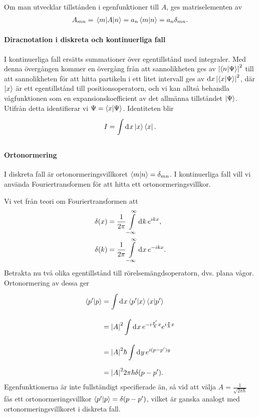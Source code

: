 Om man utvecklar tillstånden i egenfunktioner till $A$, ges matriselementen av
\begin{align*}
	A_{mn} = \mel{m}{A}{n} = a_{n}\braket{m}{n} = a_{n}\delta_{mn}.
\end{align*}

\paragraph{Diracnotation i diskreta och kontinuerliga fall}
I kontinuerliga fall ersätts summationer över egentillstånd med integraler. Med denna övergången kommer en övergång från att sannolikheten ges av $\abs{\braket{n}{\Psi}}^{2}$ till att sannolikheten för att hitta partikeln i ett litet intervall ges av $\dd{x}\abs{\braket{x}{\Psi}}^{2}$, där $\ket{x}$ är ett egentillstånd till positionsoperatorn, och vi kan alltså behandla vågfunktionen som en expansionskoefficient av det allmänna tillståndet $\ket{\Psi}$. Utifrån detta identifierar vi $\Psi = \braket{x}{\Psi}$. Identiteten blir
\begin{align*}
	I = \int\limits_{}^{}\dd[]{x}\ket{x}\bra{x}.
\end{align*}

\paragraph{Ortonormering}
I diskreta fall är ortonormeringsvillkoret $\braket{m}{n} = \delta_{mn}$. I kontinuerliga fall vill vi använda Fouriertransformen för att hitta ett ortonormeringsvillkor.

Vi vet från teori om Fouriertransformen att
\begin{align*}
	\delta(x) &= \frac{1}{2\pi}\int\limits_{-\infty}^{\infty}\dd[]{k}e^{ikx}, \\
	\delta(k) &= \frac{1}{2\pi}\int\limits_{-\infty}^{\infty}\dd[]{x}e^{-ikx}.
\end{align*}
Betrakta nu två olika egentillstånd till rörelsemängdsoperatorn, dvs. plana vågor. Ortonormering av dessa ger
\begin{align*}
	\braket{p'}{p} &= \int\limits_{}^{}\dd[]{x}\braket{p'}{x}\braket{x}{p'} \\
	               &= \abs{A}^{2}\int\limits_{}^{}\dd[]{x}e^{-i\frac{p'}{\hbar}x}e^{i\frac{p}{\hbar}x} \\
	               &= \abs{A}^{2}\hbar\int\limits_{}^{}\dd[]{y}e^{i(p - p')y} \\
	               &= \abs{A}^{2}2\pi\hbar\delta(p - p').
\end{align*}
Egenfunktionerna är inte fullständigt specifierade än, så vid att välja $A = \frac{1}{\sqrt{2\pi\hbar}}$ fås ett ortonormeringsvillkor $\braket{p'}{p} = \delta(p - p')$, vilket är ganska analogt med ortonormeringsvillkoret i diskreta fall.

